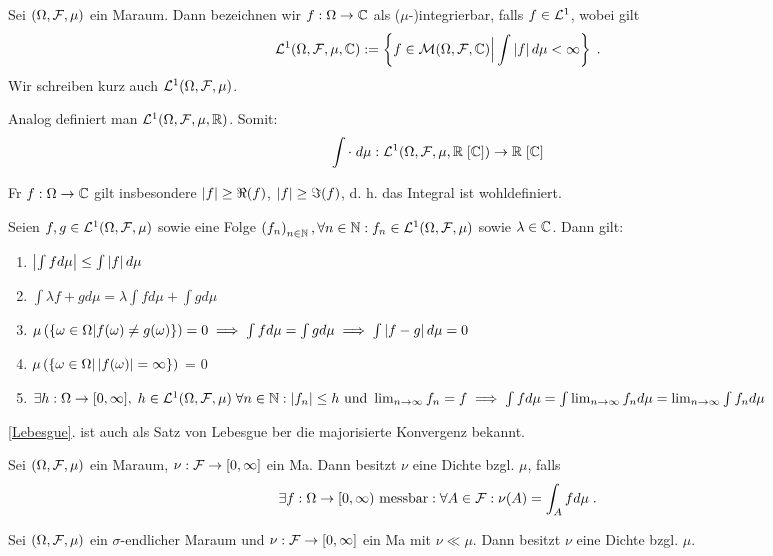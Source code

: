 \begin{definition}
		\label{integrierbare_funkt}
		Sei \((\Omega, \mathcal{F}, \mu)\) ein Ma\s raum. Dann bezeichnen wir $f: \Omega \to \mathbb{C}$ als ($\mu$-)integrierbar, falls $f\in \mathcal{L}^1$, wobei gilt
		\[\mathcal{L}^1(\Omega, \mathcal{F}, \mu, \mathbb{C}) := \left\{f\in \mathcal{M}(\Omega,\mathcal{F}, \mathbb{C})\Big\vert \int \left\lvert f \right\rvert d\mu < \infty\right\}\;.\]
		Wir schreiben kurz auch \(\mathcal{L}^1(\Omega, \mathcal{F}, \mu)\).
\end{definition}
\begin{rem}
	Analog definiert man \(\mathcal{L}^1(\Omega, \mathcal{F}, \mu, \mathbb{R})\). Somit:
	\[\int \cdot \;d\mu : \mathcal{L}^1(\Omega, \mathcal{F}, \mu, \mathbb{R}\;[\mathbb{C}]) \to \mathbb{R} \;[\mathbb{C}]\]
\end{rem}
\begin{rem}
	F\us r \(f:\Omega \to \mathbb{C}\) gilt insbesondere \(\left\lvert f \right\rvert \geq \Re(f)\), \(\left\lvert f \right\rvert \geq \Im(f)\), d. h. das Integral ist wohldefiniert.
\end{rem}
\begin{theorem}
	Seien \(f,g\in \mathcal{\mathcal{L}}^1(\Omega, \mathcal{F}, \mu)\) sowie eine Folge \(\left (f_n\right )_{n\in \mathbb{N}}, \forall n \in \mathbb{N} :f_n \in \mathcal{L}^1(\Omega, \mathcal{F}, \mu)\) sowie \(\lambda \in \mathbb{C}\). Dann gilt:
	\begin{enumerate}
		\item \(\left\lvert \int f d\mu \right\rvert \leq \int \left\lvert f \right\rvert d\mu\)
		\item \(\int \lambda f + g d \mu = \lambda \int f d \mu + \int g d \mu\)
		\item \(\mu\left(\left\{\omega\in \Omega\vert f(\omega) \neq g(\omega)\right\}\right) = 0 \implies \int f d\mu = \int g d \mu \implies \int \left\lvert f-g \right\rvert d \mu = 0\)
		\item \(\mu\left(\left\{\omega\in \Omega\vert \left\lvert f(\omega) \right\rvert = \infty\right\}\right)\) = 0
		\item \(\exists h: \Omega \to [0,\infty],\; h \in \mathcal{L}^1(\Omega, \mathcal{F},\mu)\; \forall n \in \mathbb{N}: \left\lvert f_n \right\rvert \leq h \text{ und } \lim_{n \to \infty} f_n = f \implies \int f d \mu = \int \lim_{n \to \infty} f_n d \mu = \lim_{n \to\infty} \int f_n d\mu\) \label{Lebesgue}
	\end{enumerate}
\end{theorem}
\begin{rem}
	\ref{Lebesgue}. ist auch als Satz von Lebesgue \us ber die majorisierte Konvergenz bekannt.
\end{rem}
\begin{definition}
	Sei \((\Omega, \mathcal{F}, \mu)\) ein Ma\s raum, \(\nu: \mathcal{F} \to [0,\infty]\) ein Ma\s{}. Dann besitzt $\nu$ eine Dichte bzgl. $\mu$, falls
	\[\exists f:\Omega \to [0,\infty) \text{ messbar}: \forall A \in \mathcal{F}: \nu(A) = \int_A f d\mu\;.\]
\end{definition}
\begin{theorem} \label{radon_nikodym} Sei \((\Omega, \mathcal{F}, \mu)\) ein $\sigma$-endlicher Ma\s raum und \(\nu: \mathcal{F} \to [0,\infty]\) ein Ma\s{} mit \(\nu \ll\mu\). Dann besitzt \(\nu\) eine Dichte bzgl. $\mu$.
\end{theorem}

